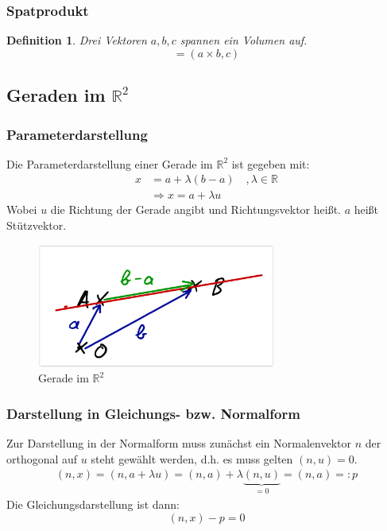 \documentclass[12pt,a4paper]{article}%
\newtheorem{definition}[satz]{Definition}
\numberwithin{equation}{section}
\newcommand{\R}{\mathbb{R}} %
\numberwithin{equation}{subsection}
\begin{document}
  \subsubsection{Spatprodukt}
  \begin{definition}
    Drei Vektoren $a,b,c$ spannen ein Volumen auf.
    \begin{equation}
      [a,b,c] = (a \times b, c)
    \end{equation}
  \end{definition}
  
  \subsection{Geraden im $\R^2$}
	  \subsubsection{Parameterdarstellung}
	  Die Parameterdarstellung einer Gerade im $\R^2$ ist gegeben mit:
	  \begin{align}
	    x &= a + \lambda(b-a)\quad, \lambda \in \R \nonumber \\
	    &\Rightarrow x = a + \lambda u
	  \end{align}
	  Wobei $u$ die Richtung der Gerade angibt und Richtungsvektor heißt. $a$ heißt Stützvektor.
	  \begin{figure}[htbp] 
		  \centering
		  \includegraphics[width=0.7\textwidth]{Geraden.png}
		  \caption{Gerade im $\R^2$\protect\cite{HM12}}
		  \label{fig:gerade_R2}
	  \end{figure}

    \subsubsection{Darstellung in Gleichungs- bzw. Normalform}
    Zur Darstellung in der Normalform muss zunächst ein Normalenvektor $n$ der orthogonal auf $u$ steht gewählt werden, d.h. es muss gelten $(n,u) = 0$.
    \begin{align}
      (n,x) = (n,a + \lambda u) = (n,a) + \lambda \underbrace{(n,u)}_{=0} = (n,a) =: p
    \end{align}
    Die Gleichungsdarstellung ist dann:
    \begin{equation}
      (n,x)-p = 0 
    \end{equation}
\end{document}
